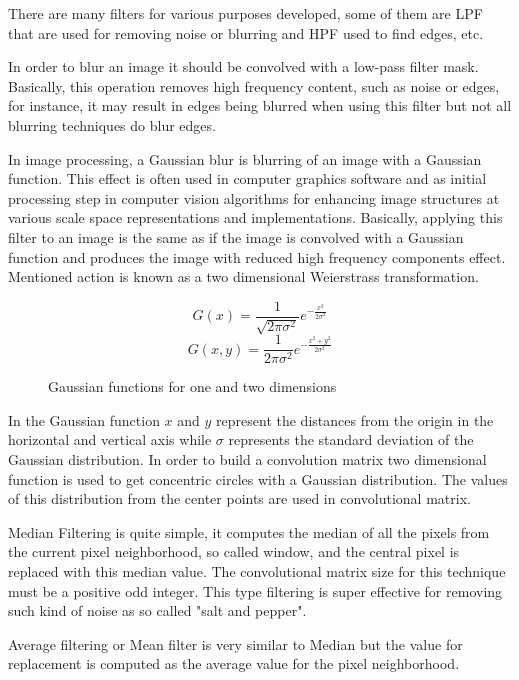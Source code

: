 \documentclass[../../../../main]{subfiles}
\begin{document}
There are many filters for various purposes developed, some of them are \ac{LPF} that are used for removing noise or blurring and \ac{HPF} used to find edges, etc.

In order to blur an image it should be convolved with a low-pass filter mask. Basically, this operation removes high frequency content, such as noise or edges, for instance, it may result in edges being blurred when using this filter but not all blurring techniques do blur edges.

In image processing, a Gaussian blur is blurring of an image with a Gaussian function. This effect is often used in computer graphics software and as initial processing step in computer vision algorithms for enhancing image structures at various scale space representations and implementations. Basically, applying this filter to an image is the same as if the image is convolved with a Gaussian function and produces the image with reduced high frequency components effect. Mentioned action is known as a two dimensional Weierstrass transformation.

\begin{figure} [!ht]
  \centering
    \begin{equation}
        G(x)=\frac{1}{\sqrt{2\pi\sigma^2}}e^{-\frac{x^2}{2\sigma^2}}
    \end{equation}
    \begin{equation}
        G(x,y)=\frac{1}{2\pi\sigma^2}e^{-\frac{x^2+y^2}{2\sigma^2}}
    \end{equation}
  \caption{Gaussian functions for one and two dimensions}
\end{figure}

In the Gaussian function $x$ and $y$ represent the distances from the origin in the horizontal and vertical axis while $\sigma$ represents the standard deviation of the Gaussian distribution. In order to build a convolution matrix two dimensional function is used to get concentric circles with a Gaussian distribution. The values of this distribution from the center points are used in convolutional matrix.

Median Filtering is quite simple, it computes the median of all the pixels from the current pixel neighborhood, so called window, and the central pixel is replaced with this median value. The convolutional matrix size for this technique must be a positive odd integer. This type filtering is super effective for removing such kind of noise as so called "salt and pepper".

Average filtering or Mean filter is very similar to Median but the value for replacement is computed as the average value for the pixel neighborhood.
\end{document}
